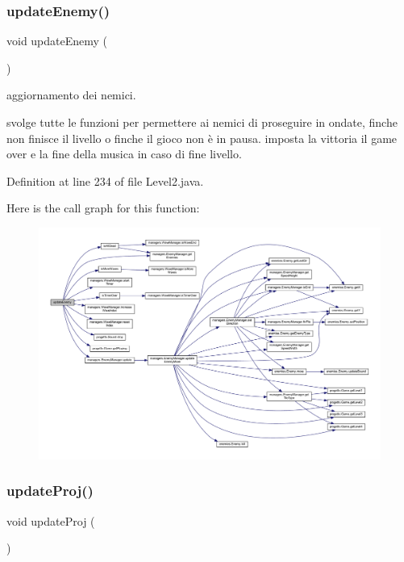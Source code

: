 \subsubsection{\texorpdfstring{update\+Enemy()}{updateEnemy()}}
{\footnotesize\ttfamily void update\+Enemy (\begin{DoxyParamCaption}{ }\end{DoxyParamCaption})}



aggiornamento dei nemici. 

svolge tutte le funzioni per permettere ai nemici di proseguire in ondate, finche non finisce il livello o finche il gioco non è in pausa. imposta la vittoria il game over e la fine della musica in caso di fine livello. 

Definition at line 234 of file Level2.\+java.

Here is the call graph for this function\+:\nopagebreak
\begin{figure}[H]
\begin{center}
\leavevmode
\includegraphics[width=350pt]{classscenes_1_1_level2_af005ec68c869a6acd5e833cba9330a50_cgraph}
\end{center}
\end{figure}
\mbox{\label{classscenes_1_1_level2_ac83c203b559f6fd0bb225744d7ccf854}} 
\subsubsection{\texorpdfstring{update\+Proj()}{updateProj()}}
{\footnotesize\ttfamily void update\+Proj (\begin{DoxyParamCaption}{ }\end{DoxyParamCaption})}



